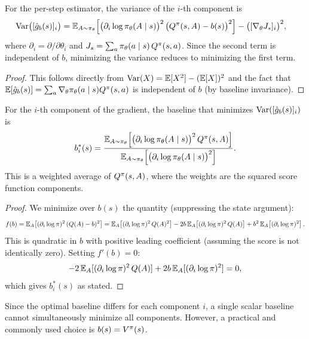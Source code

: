 \documentclass[11pt,a4paper]{article}
\begin{document}
\begin{lemma}
\label{lem:var-decomp}
For the per-step estimator, the variance of the $i$-th component is
\begin{align*}
  \operatorname{Var}\bigl([\hat{g}_b(s)]_i\bigr)
  &= \mathbb{E}_{A \sim \pi_\theta}\!\left[
     \bigl(\partial_i \log \pi_\theta(A \mid s)\bigr)^2\,
     \bigl(Q^{\pi}(s,A) - b(s)\bigr)^2\right]
     - \bigl([\nabla_\theta J_s]_i\bigr)^2,
\end{align*}
where $\partial_i = \partial/\partial \theta_i$ and
$J_s = \sum_a \pi_\theta(a \mid s)\, Q^{\pi}(s,a)$.
Since the second term is independent of $b$, minimizing the variance
reduces to minimizing the first term.
\end{lemma}

\begin{proof}
This follows directly from $\operatorname{Var}(X) = \mathbb{E}[X^2] - (\mathbb{E}[X])^2$ and the
fact that $\mathbb{E}[\hat{g}_b(s)] = \sum_a \nabla_\theta \pi_\theta(a \mid s)
Q^{\pi}(s,a)$ is independent of $b$ (by baseline invariance).
\end{proof}

\begin{theorem}
\label{thm:optimal-baseline-scalar}
For the $i$-th component of the gradient, the baseline that minimizes
$\operatorname{Var}([\hat{g}_b(s)]_i)$ is
\[
  b^*_i(s) = \frac{\mathbb{E}_{A \sim \pi_\theta}\!\left[
    \bigl(\partial_i \log \pi_\theta(A \mid s)\bigr)^2\, Q^{\pi}(s,A)
    \right]}
    {\mathbb{E}_{A \sim \pi_\theta}\!\left[
    \bigl(\partial_i \log \pi_\theta(A \mid s)\bigr)^2\right]}.
\]
This is a weighted average of $Q^{\pi}(s,A)$, where the weights are the
squared score function components.
\end{theorem}

\begin{proof}
We minimize over $b(s)$ the quantity (suppressing the state argument):
\[
  f(b) = \mathbb{E}_A\!\left[(\partial_i \log \pi)^2\,
  (Q(A) - b)^2\right]
  = \mathbb{E}_A\!\left[(\partial_i \log \pi)^2\, Q(A)^2\right]
  - 2b\, \mathbb{E}_A\!\left[(\partial_i \log \pi)^2\, Q(A)\right]
  + b^2\, \mathbb{E}_A\!\left[(\partial_i \log \pi)^2\right].
\]
This is quadratic in $b$ with positive leading coefficient (assuming the
score is not identically zero). Setting $f'(b) = 0$:
\[
  -2\, \mathbb{E}_A[(\partial_i \log \pi)^2\, Q(A)]
  + 2b\, \mathbb{E}_A[(\partial_i \log \pi)^2] = 0,
\]
which gives $b^*_i(s)$ as stated.
\end{proof}

Since the optimal baseline differs for each component $i$, a single
scalar baseline cannot simultaneously minimize all components. However, a
practical and commonly used choice is $b(s) = V^{\pi}(s)$.
\end{document}
